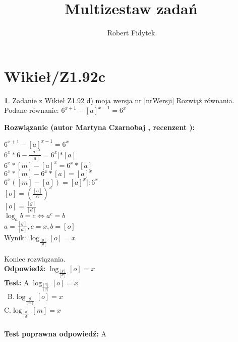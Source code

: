 \documentclass[12pt, a4paper]{article}
\title{Multizestaw zadań}
\author{Robert Fidytek}
\date{}
\theoremstyle{definition} %
\newtheorem{zad}{}
\newcommand{\kategoria}[1]{\section{#1}} %
\newcommand{\zadStart}[1]{\begin{zad}#1\newline} %
\newcommand{\zadStop}{\end{zad}}   %
\newcommand{\rozwStart}[2]{\noindent \textbf{Rozwiązanie (autor #1 , recenzent #2): }\newline} %
\newcommand{\rozwStop}{\newline}                                            %
\newcommand{\odpStart}{\noindent \textbf{Odpowiedź:}\newline}    %
\newcommand{\odpStop}{\newline}                                             %
\newcommand{\testStart}{\noindent \textbf{Test:}\newline} %
\newcommand{\testStop}{\newline} %
\newcommand{\kluczStart}{\noindent \textbf{Test poprawna odpowiedź:}\newline} %
\newcommand{\kluczStop}{\newline} %
\begin{document}
\maketitle

\kategoria{Wikieł/Z1.92c}
\zadStart{Zadanie z Wikieł Z1.92 d) moja wersja nr [nrWersji]}
Rozwiąż równania.\\
Podane równanie: $ 6^{x + 1} - [a]^{x - 1} = 6^{x} $\\
\zadStop
\rozwStart{Martyna Czarnobaj}{}
\begin{center}
	$ 6^{x + 1} - [a]^{x - 1} = 6^{x} $\\
	$ 6^{x}*6 - \frac{[a]^{x}}{[a]} = 6^{x} |*[a] $\\
	$ 6^{x}*[m] - [a]^{x} = 6^{x}*[a] $\\
	$ 6^{x}*[m] - 6^{x}*[a] = [a]^{x} $\\
	$ 6^{x}([m]-[a]) = [a]^{x} |:6^{x} $\\
	$ [o]=(\frac{[a]}{6})^{x} $\\
	$ [o]=\frac{[g]}{[d]}$\\
	$ \log_{a} b = c \Leftrightarrow a^{c} = b $\\
	$ a = \frac{[g]}{[d]}, c = x, b = [o] $\\
	Wynik: $ \log_{\frac{[g]}{[d]}} [o] = x $\\
\end{center}
Koniec rozwiązania.\\
\rozwStop
\odpStart
 $ \log_{\frac{[g]}{[d]}} [o] = x $\\
\odpStop
\testStart
A.$ \log_{\frac{[g]}{[d]}} [o] = x $\\\
B.$ \log_{\frac{[g]}{[m]}} [o] = x $\\
C.$ \log_{\frac{[g]}{[d]}} [m] = x $\\\\
\testStop
\kluczStart
A
\kluczStop
\end{document}
